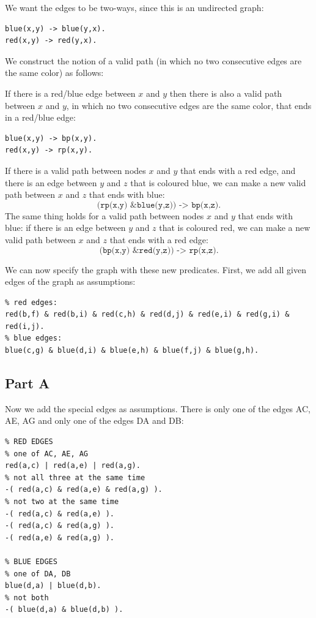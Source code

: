 \documentclass[12pt]{article}
\begin{document}
We want the edges to be two-ways, since this is an undirected graph:
\begin{verbatim}
blue(x,y) -> blue(y,x).
red(x,y) -> red(y,x).
\end{verbatim}

We construct the notion of a valid path (in which no two consecutive edges are the same color) as follows:

If there is a red/blue edge between $x$ and $y$ then there is also a valid path between $x$ and $y$, in which no two consecutive edges are the same color, that ends in a red/blue edge:
\begin{verbatim}
blue(x,y) -> bp(x,y).
red(x,y) -> rp(x,y).
\end{verbatim}

If there is a valid path between nodes $x$ and $y$ that ends with a red edge, and there is an edge between $y$ and $z$ that is coloured blue, we can make a new valid path between $x$ and $z$ that ends with blue:
\[ \texttt{(rp(x,y) \& blue(y,z)) -> bp(x,z).}\]
The same thing holds for a valid path between nodes $x$ and $y$ that ends with blue: if there is an edge between $y$ and $z$ that is coloured red, we can make a new valid path between $x$ and $z$ that ends with a red edge:
\[ \texttt{(bp(x,y) \& red(y,z)) -> rp(x,z).} \]

We can now specify the graph with these new predicates. First, we add all given edges of the graph as assumptions:
\begin{verbatim}
% red edges:
red(b,f) & red(b,i) & red(c,h) & red(d,j) & red(e,i) & red(g,i) & red(i,j).
% blue edges:
blue(c,g) & blue(d,i) & blue(e,h) & blue(f,j) & blue(g,h).
\end{verbatim}

\subsection*{Part A}
Now we add the special edges as assumptions.
There is only one of the edges AC, AE, AG and only one of the edges DA and DB:
\begin{verbatim}
% RED EDGES
% one of AC, AE, AG
red(a,c) | red(a,e) | red(a,g).
% not all three at the same time
-( red(a,c) & red(a,e) & red(a,g) ).
% not two at the same time
-( red(a,c) & red(a,e) ).
-( red(a,c) & red(a,g) ).
-( red(a,e) & red(a,g) ).

% BLUE EDGES
% one of DA, DB
blue(d,a) | blue(d,b).
% not both
-( blue(d,a) & blue(d,b) ).
\end{verbatim}
\end{document}
